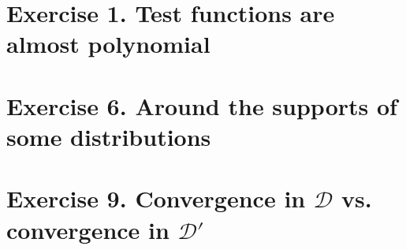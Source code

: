 %
\section{Exercise 1. Test functions are almost polynomial}


%
\setcounter{section}{5}
%
\section{Exercise 6. Around the supports of some distributions}

%
\setcounter{section}{8}
%
\section{Exercise 9. Convergence in $\mathcal{D}$ vs. convergence in $\mathcal{D}'$}

%
\setcounter{section}{16}
%
%
% 